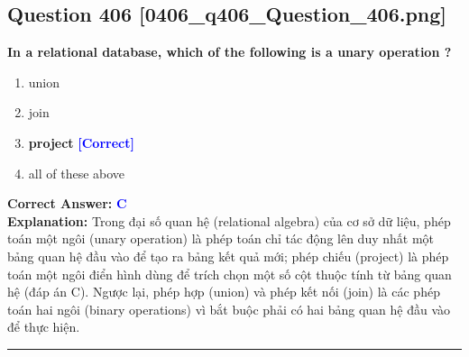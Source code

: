 \documentclass[11pt,a4paper]{article}
\begin{document}
\begin{minipage}{\textwidth}
\subsection*{Question 406 \quad \footnotesize{[0406\_q406\_Question\_406.png]}}
\noindent \textbf{In a relational database, which of the following is a unary operation ?}

\begin{enumerate}[label=\Alph*.]
    \item union
    \item join
    \item \textbf{project} \hfill \textcolor{blue}{\textbf{[Correct]}}
    \item all of these above
\end{enumerate}

\noindent \textbf{Correct Answer:} \textcolor{blue}{\textbf{C}} \\[2pt]
\noindent \textbf{Explanation:} Trong đại số quan hệ (relational algebra) của cơ sở dữ liệu, phép toán một ngôi (unary operation) là phép toán chỉ tác động lên duy nhất một bảng quan hệ đầu vào để tạo ra bảng kết quả mới; phép chiếu (project) là phép toán một ngôi điển hình dùng để trích chọn một số cột thuộc tính từ bảng quan hệ (đáp án C). Ngược lại, phép hợp (union) và phép kết nối (join) là các phép toán hai ngôi (binary operations) vì bắt buộc phải có hai bảng quan hệ đầu vào để thực hiện.

\par\vspace{0.3cm}
\hrule
\vspace{0.3cm}
\end{minipage}
\end{document}

